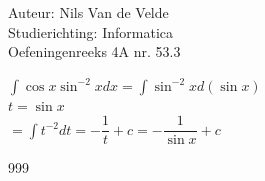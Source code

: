 \documentclass[a4paper]{article}
\begin{document}
\newcommand{\dint}{\displaystyle\int}
  
\noindent \large Auteur: Nils Van de Velde \\
\noindent \large Studierichting: Informatica\\
\noindent \large Oefeningenreeks 4A nr. 53.3\\

\medskip

\normalsize

$\dint\cos x\sin^{-2}xdx=\dint\sin^{-2}xd(\sin x)$\\

$t = \sin x$\\

$=\dint t^{-2}dt=-\dfrac{1}{t}+c=-\dfrac{1}{\sin x}+c$\\

\begin{thebibliography}{999}
\end{thebibliography}
\end{document}
